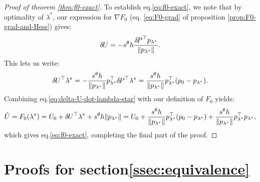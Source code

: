 \documentclass[smallcondensed]{svjour3}
\begin{document}
\begin{proof}[Proof of theorem \ref{thm:f0-exact}]
  To establish eq.\@ \ref{eq:f0-exact}, we note that by optimality
  of $\lambda^*$, our expression for $\nabla F_0$ (eq.\@
  \ref{eq:F0-grad} of proposition \ref{prop:F0-grad-and-Hess}) gives:
  \begin{equation}
    {\delta \hspace{-0.09em} U} = -s^\theta h \frac{{\delta \hspace{-0.14em} P}^\top p_{\lambda^*}}{\|p_{\lambda^*}\|}.
  \end{equation}
  This lets us write:
  \begin{equation}\label{eq:delta-U-dot-lambda-star}
    {\delta \hspace{-0.09em} U}^\top \lambda^* = -\frac{s^\theta h}{\|p_{\lambda^*}\|} p_{\lambda^*}^\top {\delta \hspace{-0.14em} P}^\top \lambda^* = \frac{s^\theta h}{\|p_{\lambda^*}\|} p_{\lambda^*}^\top {(p_0 - p_{\lambda^*})}.
  \end{equation}
  Combining eq.\@ \ref{eq:delta-U-dot-lambda-star} with our
  definition of $F_0$ yields:
  \begin{equation}
    \hat{U} = F_0(\lambda^*) = U_0 + {\delta \hspace{-0.09em} U}^\top \lambda^* + s^\theta h \|p_{\lambda^*}\| = U_0 + \frac{s^\theta h}{\|p_{\lambda^*}\|} p_{\lambda^*}^\top {(p_0 - p_{\lambda^*})} + \frac{s^\theta h}{\|p_{\lambda^*}\|} p_{\lambda^*}^\top p_{\lambda^*},
  \end{equation}
  which gives eq.\@ \ref{eq:f0-exact}, completing the final part of
  the proof.
\end{proof}

\section{Proofs for section\@ \ref{ssec:equivalence}}\label{sec:equivalence-proofs}
\end{document}
